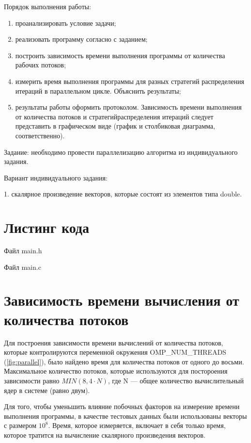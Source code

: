 Порядок выполнения работы:
\begin{enumerate}
\item проанализировать условие задачи;
\item реализовать программу согласно с заданием;
\item построить зависимость времени выполнения программы от количества рабочих потоков;
\item измерить время выполнения программы для разных стратегий распределения итераций в параллельном цикле. Объяснить результаты;
\item результаты работы оформить протоколом. Зависимость времени выполнения от количества потоков и стратегийраспределения итераций следует представить в графическом виде (график и столбиковая диаграмма, соответственно).
\end{enumerate}


Задание: необходимо провести параллелизацию алгоритма из индивидуального задания.


Вариант индивидуального задания: 


1. скалярное произведение векторов, которые состоят из элементов типа double.

\chapter{Листинг кода}
Файл main.h
\lstset{inputencoding=utf8, extendedchars=\true}


Файл main.c
\lstset{inputencoding=utf8, extendedchars=\true}

\chapter{Зависимость времени вычисления от количества потоков}

Для построения зависимости времени вычислений от количества потоков, которые контролируются переменной окружения OMP\_NUM\_THREADS (\ref{fig:parallel}), было найдено время для количества потоков от одного до восьми. Максимальное количество потоков, которые используются для постороения зависимости равно $MIN\left(8, 4\cdot N\right)$, где N --- общее количество вычислительный ядер в системе (равно двум).

Для того, чтобы уменьшить влияние побочных факторов на измерение времени выполнения программы, в качестве тестовых данных были использованы векторы с размером $10^8$. Время, которое измеряется, включает в себя только время, которое тратится на вычисление скалярного произведения векторов.

